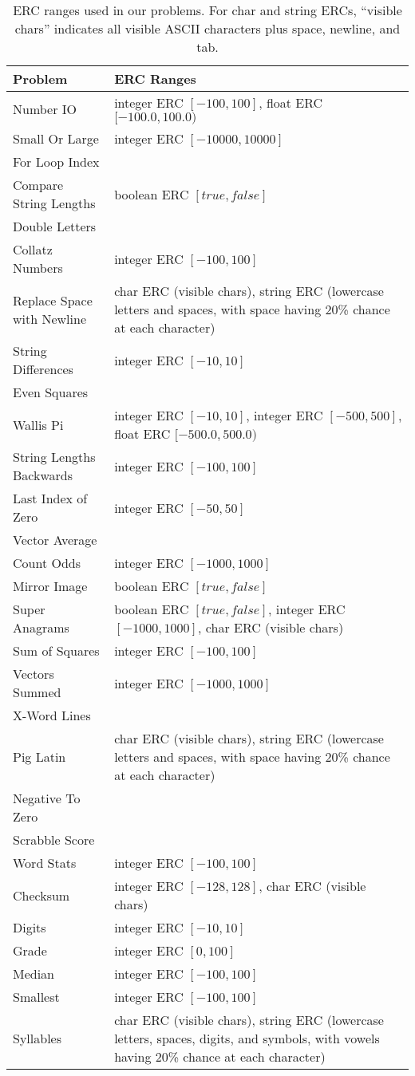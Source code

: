 \documentclass{sig-alternate}
\begin{document}
\begin{table*}[t]
\centering
\caption{ERC ranges used in our problems. For char and string ERCs, ``visible chars'' indicates all visible ASCII characters plus space, newline, and tab.}
\label{tableERCranges}
\begin{tabular}{l>{\raggedright}p{10.6cm}}
\toprule
Problem                    & ERC Ranges \tabularnewline
\midrule
Number IO                  & integer ERC $[-100, 100]$, float ERC $[-100.0, 100.0)$ \tabularnewline
Small Or Large             & integer ERC $[-10000,10000]$        \tabularnewline
For Loop Index             &                         \tabularnewline
Compare String Lengths     & boolean ERC $[true, false]$ \tabularnewline
Double Letters             & \tabularnewline
Collatz Numbers            & integer ERC $[-100, 100]$  \tabularnewline
Replace Space with Newline & char ERC (visible chars), string ERC (lowercase letters and spaces, with space having 20\% chance at each character)   \tabularnewline
String Differences         & integer ERC $[-10, 10]$                       \tabularnewline
Even Squares               & \tabularnewline
Wallis Pi                  & integer ERC $[-10, 10]$, integer ERC $[-500, 500]$, float ERC $[-500.0, 500.0)$ \tabularnewline
String Lengths Backwards   & integer ERC $[-100, 100]$               \tabularnewline
Last Index of Zero         & integer ERC $[-50, 50]$     \tabularnewline
Vector Average             &     \tabularnewline
Count Odds                 & integer ERC $[-1000, 1000]$       \tabularnewline
Mirror Image               & boolean ERC $[true, false]$          \tabularnewline
Super Anagrams             & boolean ERC $[true, false]$, integer ERC $[-1000, 1000]$, char ERC (visible chars) \tabularnewline
Sum of Squares             & integer ERC $[-100, 100]$       \tabularnewline
Vectors Summed             & integer ERC $[-1000, 1000]$            \tabularnewline
X-Word Lines               &             \tabularnewline
Pig Latin                  & char ERC (visible chars), string ERC (lowercase letters and spaces, with space having 20\% chance at each character)  \tabularnewline
Negative To Zero           &             \tabularnewline
Scrabble Score             & \tabularnewline
Word Stats                 & integer ERC $[-100, 100]$           \tabularnewline
Checksum                   & integer ERC $[-128, 128]$, char ERC (visible chars)      \tabularnewline
Digits                     & integer ERC $[-10, 10]$          \tabularnewline
Grade                      & integer ERC $[0, 100]$         \tabularnewline
Median                     & integer ERC $[-100, 100]$            \tabularnewline
Smallest                   & integer ERC $[-100, 100]$           \tabularnewline
Syllables                  & char ERC (visible chars), string ERC (lowercase letters, spaces, digits, and symbols, with vowels having 20\% chance at each character) \tabularnewline
\bottomrule
\end{tabular}
\end{table*}
\end{document}
